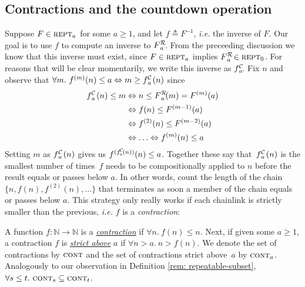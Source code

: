 \subsection{Contractions and the countdown operation}

Suppose $F \in \text{\scshape{rept}}_a$ for some $a \ge 1$, and
let $f \triangleq F^{-1}$, \emph{i.e.} the inverse of $F$.
Our goal is to use $f$ to compute an inverse to $\rf{F}{a}$.
From the preceeding discussion we know that this inverse must exist,
since $F \in \text{\scshape{rept}}_a$ implies $\rf{F}{a} \in \repeatable_0$.
For reasons that will be clear momentarily, we write this inverse as $\cdt{f}{a}$.  
Fix $n$ and observe that $\forall m.~f^{(m)}(n)\le a \iff m \ge \cdt{f}{a}(n)$
since
\begin{equation} \label{eq: rf-upp-inv}
\begin{aligned}
\cdt{f}{a}(n) \le m & \iff n\le \rf{F}{a}(m) = F^{(m)}(a) \\
& \iff f(n)\le F^{(m-1)}(a) \\
& \iff f^{(2)}(n)\le F^{(m-2)}(a) \\
& \iff \ldots \iff f^{(m)}(n)\le a
\end{aligned}
\end{equation}
Setting $m$ as $\cdt{f}{a}(n)$ gives us
$f^{(\cdt{f}{a}(n))}(n) \le a$.
Together these say that~$\cdt{f}{a}(n)$ is the smallest number of
times~$f$ needs to be compositionally applied to $n$ before the result
equals or passes below $a$.
In other words, count the length of the chain $\{n, f(n), f^{(2)}(n), \ldots\}$ that
terminates as soon a member of the chain equals or passes below $a$.
This strategy only really works if each chainlink is strictly smaller than the previous,
\emph{i.e.} $f$ is a \emph{contraction}:
\begin{defn} \label{defn: contracting}
	A function $f : \mathbb{N} \to \mathbb{N}$ is a
	\href{https://github.com/inv-ack/inv-ack/blob/7270e64a2600b771f2b1b1b151f7d13fb2ae6c97/countdown.v#L40-L42}{\color{blue}\emph{contraction}} if $\forall n.~ f(n) \le n$. Next, if given some $a \ge 1$, a contraction $f$ is
	\href{https://github.com/inv-ack/inv-ack/blob/7270e64a2600b771f2b1b1b151f7d13fb2ae6c97/countdown.v#L44-L46}{\color{blue}\emph{strict above}} $a$ if $\forall n > a.~n > f(n)$. We denote the set of contractions by $\text{\scshape{cont}}$ and the set of contractions strict above~$a$ by $\text{\scshape{cont}}_a$. Analogously to our observation in
	Definition \ref{rem: repeatable-subset}, \lb $\forall s\le t.~ \text{\scshape{cont}}_s \subseteq \text{\scshape{cont}}_t$.
\end{defn}

